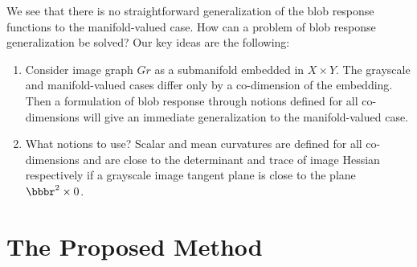 \documentclass{llncs}
\begin{document}
We see that there is no straightforward generalization of the blob response functions to the manifold-valued case. How can a problem of blob response generalization be solved? Our key ideas are the following:

\begin{enumerate}
\item	Consider image graph $Gr$ as a submanifold embedded in $X\times Y$. The grayscale and manifold-valued cases differ only by a co-dimension of the embedding. Then a formulation of blob response through notions defined for all co-dimensions will give an immediate generalization to the manifold-valued case. 
\item	What notions to use? Scalar and mean curvatures are defined for all co-dimensions and are close to the determinant and trace of image Hessian respectively if a grayscale image tangent plane is close to the plane $\bbbr^2\times 0$.
\end{enumerate}

\section{The Proposed Method}
\end{document}
